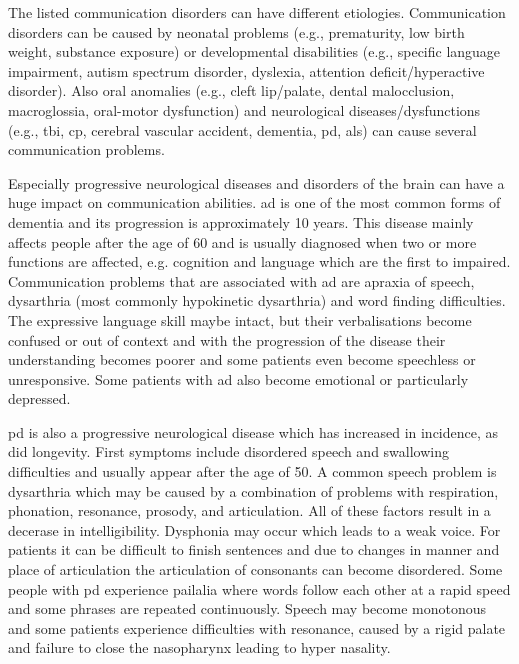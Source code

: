 The listed communication disorders can have different etiologies. Communication disorders can be caused by neonatal problems (e.g., prematurity, low birth weight, substance exposure) or developmental disabilities (e.g., specific language impairment, autism spectrum disorder, dyslexia, attention deficit/hyperactive disorder). Also oral anomalies (e.g., cleft lip/palate, dental malocclusion, macroglossia, oral-motor dysfunction) and neurological diseases/dysfunctions (e.g., \gls{tbi}, \gls{cp}, cerebral vascular accident, dementia, \gls{pd}, \gls{als}) can cause several communication problems.

Especially progressive neurological diseases and disorders of the brain can have a huge impact on communication abilities. \gls{ad} is one of the most common forms of dementia and its progression is approximately 10 years. This disease mainly affects people after the age of 60 and is usually diagnosed when two or more functions are affected, e.g. cognition and language which are the first to impaired. Communication problems that are associated with \gls{ad} are \gls{apraxia} of speech, \gls{dysarthria} (most commonly hypokinetic dysarthria)  and word finding difficulties. The expressive language skill maybe intact, but their verbalisations become confused or out of context and with the progression of the disease their understanding becomes poorer and some patients even become speechless or unresponsive. Some patients with \gls{ad} also become emotional or particularly depressed. \cite{communicationDifficulties} 
 
\gls{pd} is also a progressive neurological disease which has increased in incidence, as did longevity. First symptoms include disordered speech and swallowing difficulties and usually appear after the age of 50. A common speech problem is \gls{dysarthria} which may be caused by a combination of problems with respiration, phonation, resonance, prosody, and articulation. All of these factors result in a decerase in intelligibility. Dysphonia may occur which leads to a weak voice. For patients it can be difficult to finish sentences and due to changes in manner and place of articulation the articulation of consonants can become disordered. Some people with \gls{pd} experience pailalia where words follow each other at a rapid speed and some phrases are repeated continuously. Speech may become monotonous and some patients experience difficulties with resonance, caused by a rigid palate and failure to close the nasopharynx leading to hyper nasality.\cite{communicationDifficulties}

